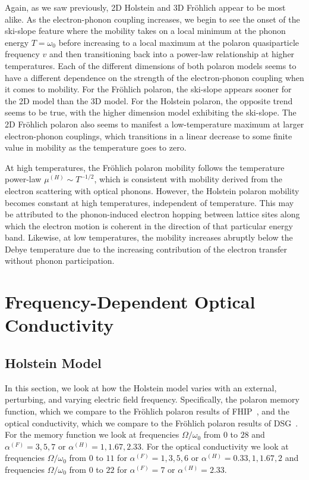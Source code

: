 Again, as we saw previously, 2D Holstein and 3D Fr\"ohlich appear to be most alike. As the electron-phonon coupling increases, we begin to see the onset of the ski-slope feature where the mobility takes on a local minimum at the phonon energy $T = \omega_0$ before increasing to a local maximum at the polaron quasiparticle frequency $v$ and then transitioning back into a power-law relationship at higher temperatures. Each of the different dimensions of both polaron models seems to have a different dependence on the strength of the electron-phonon coupling when it comes to mobility. For the Fr\"ohlich polaron, the ski-slope appears sooner for the 2D model than the 3D model. For the Holstein polaron, the opposite trend seems to be true, with the higher dimension model exhibiting the ski-slope. The 2D Fr\"ohlich polaron also seems to manifest a low-temperature maximum at larger electron-phonon couplings, which transitions in a linear decrease to some finite value in mobility as the temperature goes to zero.

At high temperatures, the Fr\"ohlich polaron mobility follows the temperature power-law $\mu^{(H)} \sim T^{-1/2}$, which is consistent with mobility derived from the electron scattering with optical phonons. However, the Holstein polaron mobility becomes constant at high temperatures, independent of temperature. This may be attributed to the phonon-induced electron hopping between lattice sites along which the electron motion is coherent in the direction of that particular energy band. Likewise, at low temperatures, the mobility increases abruptly below the Debye temperature due to the increasing contribution of the electron transfer without phonon participation.

\section{Frequency-Dependent Optical Conductivity}
\label{sec:5-2}

\subsection{Holstein Model}
\label{subsec:5-2-1}

In this section, we look at how the Holstein model varies with an external, perturbing, and varying electric field frequency. Specifically, the polaron memory function, which we compare to the Fr\"ohlich polaron results of FHIP~\cite{feynman_mobility_1962}, and the optical conductivity, which we compare to the Fr\"ohlich polaron results of DSG~\cite{devreese_optical_1972}. For the memory function we look at frequencies $\Omega / \omega_0$ from $0$ to $28$ and $\alpha^{(F)} = 3, 5, 7$ or $\alpha^{(H)} = 1, 1.67, 2.33$. For the optical conductivity we look at frequencies $\Omega / \omega_0$ from $0$ to $11$ for $\alpha^{(F)} = 1, 3, 5, 6$ or $\alpha^{(H)} = 0.33, 1, 1.67, 2$ and frequencies $\Omega / \omega_0$ from $0$ to $22$ for $\alpha^{(F)} = 7$ or $\alpha^{(H)} = 2.33$. 

